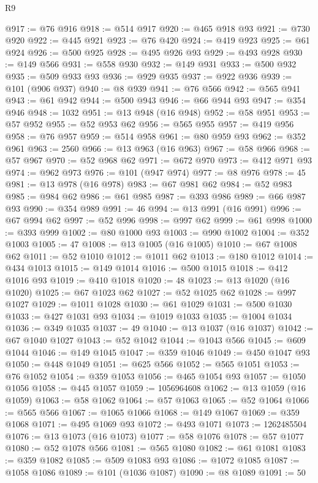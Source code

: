 \begin{lexlean}{R9}
\begin{coremodule}
@917 := @76 @916
@918 := @514 @917
@920 := @465 @918 @93
@921 := @730 @920
@922 := @445 @921
@923 := @76 @420
@924 := @419 @923
@925 := @61 @924
@926 := @500 @925
@928 := @495 @926 @93
@929 := @493 @928
@930 := @149 @566
@931 := @558 @930
@932 := @149 @931
@933 := @500 @932
@935 := @509 @933 @93
@936 := @929 @935
@937 := @922 @936
@939 := @101 (@906 @937)
@940 := @8 @939
@941 := @76 @566
@942 := @565 @941
@943 := @61 @942
@944 := @500 @943
@946 := @66 @944 @93
@947 := @354 @946
@948 := 1032
@951 := @13 @948 (@16 @948)
@952 := @58 @951
@953 := @57 @952
@955 := @52 @953 @62
@956 := @565 @955
@957 := @419 @956
@958 := @76 @957
@959 := @514 @958
@961 := @80 @959 @93
@962 := @352 @961
@963 := 2560
@966 := @13 @963 (@16 @963)
@967 := @58 @966
@968 := @57 @967
@970 := @52 @968 @62
@971 := @672 @970
@973 := @412 @971 @93
@974 := @962 @973
@976 := @101 (@947 @974)
@977 := @8 @976
@978 := 45
@981 := @13 @978 (@16 @978)
@983 := @67 @981 @62
@984 := @52 @983
@985 := @984 @62
@986 := @61 @985
@987 := @393 @986
@989 := @66 @987 @93
@990 := @354 @989
@991 := 46
@994 := @13 @991 (@16 @991)
@996 := @67 @994 @62
@997 := @52 @996
@998 := @997 @62
@999 := @61 @998
@1000 := @393 @999
@1002 := @80 @1000 @93
@1003 := @990 @1002
@1004 := @352 @1003
@1005 := 47
@1008 := @13 @1005 (@16 @1005)
@1010 := @67 @1008 @62
@1011 := @52 @1010
@1012 := @1011 @62
@1013 := @180 @1012
@1014 := @434 @1013
@1015 := @149 @1014
@1016 := @500 @1015
@1018 := @412 @1016 @93
@1019 := @410 @1018
@1020 := 48
@1023 := @13 @1020 (@16 @1020)
@1025 := @67 @1023 @62
@1027 := @52 @1025 @62
@1028 := @997 @1027
@1029 := @1011 @1028
@1030 := @61 @1029
@1031 := @500 @1030
@1033 := @427 @1031 @93
@1034 := @1019 @1033
@1035 := @1004 @1034
@1036 := @349 @1035
@1037 := 49
@1040 := @13 @1037 (@16 @1037)
@1042 := @67 @1040 @1027
@1043 := @52 @1042
@1044 := @1043 @566
@1045 := @609 @1044
@1046 := @149 @1045
@1047 := @359 @1046
@1049 := @450 @1047 @93
@1050 := @448 @1049
@1051 := @625 @566
@1052 := @565 @1051
@1053 := @76 @1052
@1054 := @359 @1053
@1056 := @465 @1054 @93
@1057 := @1050 @1056
@1058 := @445 @1057
@1059 := 1056964608
@1062 := @13 @1059 (@16 @1059)
@1063 := @58 @1062
@1064 := @57 @1063
@1065 := @52 @1064
@1066 := @565 @566
@1067 := @1065 @1066
@1068 := @149 @1067
@1069 := @359 @1068
@1071 := @495 @1069 @93
@1072 := @493 @1071
@1073 := 1262485504
@1076 := @13 @1073 (@16 @1073)
@1077 := @58 @1076
@1078 := @57 @1077
@1080 := @52 @1078 @566
@1081 := @565 @1080
@1082 := @61 @1081
@1083 := @359 @1082
@1085 := @509 @1083 @93
@1086 := @1072 @1085
@1087 := @1058 @1086
@1089 := @101 (@1036 @1087)
@1090 := @8 @1089
@1091 := 50

\end{coremodule}
\end{lexlean}
